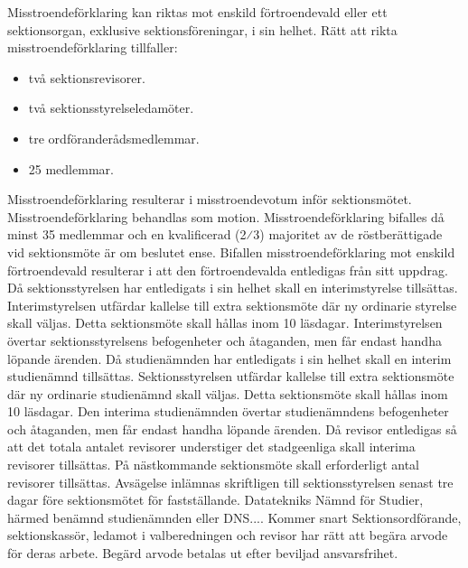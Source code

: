 \documentclass[a4paper]{dtek}
\begin{document}
\para[Misstroendeförklaring] Misstroendeförklaring kan riktas mot enskild förtroendevald eller ett sektionsorgan, exklusive sektionsföreningar, i sin helhet.
\para Rätt att rikta misstroendeförklaring tillfaller:
\begin{itemize}
  \item två sektionsrevisorer.
  \item två sektionsstyrelseledamöter.
  \item tre ordföranderådsmedlemmar.
  \item 25 medlemmar.
\end{itemize}
\para Misstroendeförklaring resulterar i misstroendevotum inför sektionsmötet. Misstroendeförklaring behandlas som motion.
\para Misstroendeförklaring bifalles då minst 35 medlemmar och en kvalificerad (2⁄3) majoritet av de röstberättigade vid sektionsmöte är om beslutet ense.
\para Bifallen misstroendeförklaring mot enskild förtroendevald resulterar i att den förtroendevalda entledigas från sitt uppdrag.
\para Då sektionsstyrelsen har entledigats i sin helhet skall en interimstyrelse tillsättas. Interimstyrelsen utfärdar kallelse till extra sektionsmöte där ny ordinarie styrelse skall väljas. Detta sektionsmöte skall hållas inom 10 läsdagar. Interimstyrelsen övertar sektionsstyrelsens befogenheter och åtaganden, men får endast handha löpande ärenden.
\para Då studienämnden har entledigats i sin helhet skall en interim studienämnd tillsättas. Sektionsstyrelsen utfärdar kallelse till extra sektionsmöte där ny ordinarie studienämnd skall väljas. Detta sektionsmöte skall hållas inom 10 läsdagar. Den interima studienämnden övertar studienämndens befogenheter och åtaganden, men får endast handha löpande ärenden.
\para Då revisor entledigas så att det totala antalet revisorer understiger det stadgeenliga skall interima revisorer tillsättas. På nästkommande sektionsmöte skall erforderligt antal revisorer tillsättas.
\para[Avsägelse] Avsägelse inlämnas skriftligen till sektionsstyrelsen senast tre dagar före sektionsmötet för fastställande.
 Datatekniks Nämnd för Studier, härmed benämnd studienämnden eller DNS....
\para[Ordföranderåd] Kommer snart
\para[Arvode] Sektionsordförande, sektionskassör, ledamot i valberedningen och revisor har rätt att begära arvode för deras arbete.
\para Begärd arvode betalas ut efter beviljad ansvarsfrihet.

\end{document}
